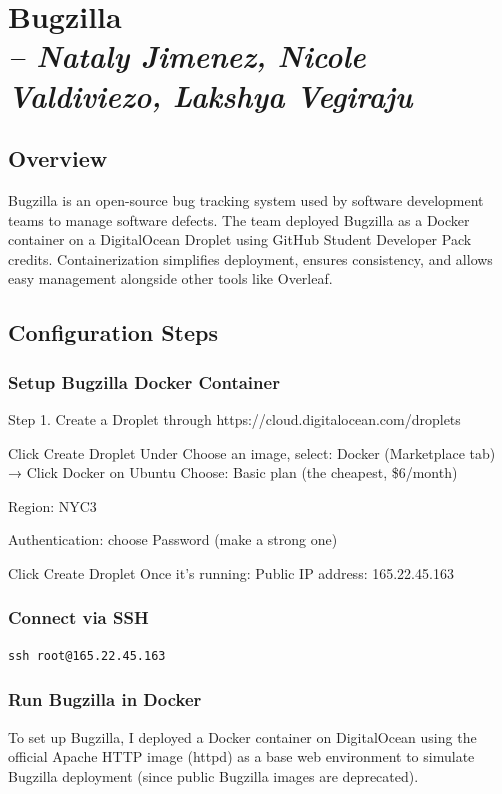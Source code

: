 \chapter{Bugzilla \\
\small{\textit{-- Nataly Jimenez, Nicole Valdiviezo, Lakshya Vegiraju}}
\label{Chapter::Bugzilla}}


\section{Overview}
Bugzilla is an open-source bug tracking system used by software development teams to manage software defects. The team deployed Bugzilla as a Docker container on a DigitalOcean Droplet using GitHub Student Developer Pack credits. Containerization simplifies deployment, ensures consistency, and allows easy management alongside other tools like Overleaf.

\section{Configuration Steps}

\subsection{Setup Bugzilla Docker Container}
Step 1. Create a Droplet through https://cloud.digitalocean.com/droplets

Click Create Droplet
Under Choose an image, select:
Docker (Marketplace tab) → Click Docker on Ubuntu
Choose:
Basic plan (the cheapest, \$6/month)

Region:  NYC3

Authentication: choose Password (make a strong one)

Click Create Droplet
Once it's running:
Public IP address: 165.22.45.163

\subsection{Connect via SSH}
\begin{verbatim}
ssh root@165.22.45.163
\end{verbatim}

\subsection{Run Bugzilla in Docker}
To set up Bugzilla, I deployed a Docker container on DigitalOcean using the official Apache HTTP image (httpd) as a base web environment to simulate Bugzilla deployment (since public Bugzilla images are deprecated).

